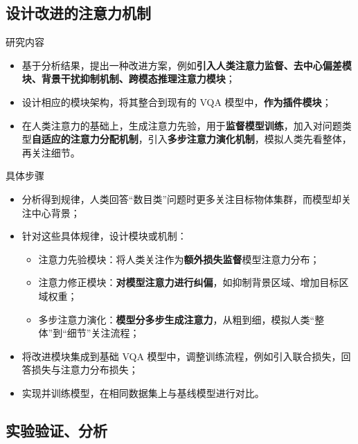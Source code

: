 \documentclass{beamer}
\begin{document}
\subsection{设计改进的注意力机制}

\begin{frame}{研究内容}
    \begin{itemize}
        \item 基于分析结果，提出一种改进方案，例如\textcolor{deepred}{\textbf{引入人类注意力监督、去中心偏差模块、背景干扰抑制机制、跨模态推理注意力模块}}；
        \item 设计相应的模块架构，将其整合到现有的 VQA 模型中，\textcolor{deepred}{\textbf{作为插件模块}}；
        \item 在人类注意力的基础上，生成注意力先验，用于\textcolor{deepred}{\textbf{监督模型训练}}，加入对问题类型\textcolor{deepred}{\textbf{自适应的注意力分配机制}}，引入\textcolor{deepred}{\textbf{多步注意力演化机制}}，模拟人类先看整体，再关注细节。
    \end{itemize}
\end{frame}


\begin{frame}{具体步骤}
    \begin{itemize}
        \item 分析得到规律，人类回答“数目类”问题时更多关注目标物体集群，而模型却关注中心背景；
        \item 针对这些具体规律，设计模块或机制：
        \begin{itemize}
            \item 注意力先验模块：将人类关注作为\textcolor{deepred}{\textbf{额外损失监督}}模型注意力分布；
            \item 注意力修正模块：\textcolor{deepred}{\textbf{对模型注意力进行纠偏}}，如抑制背景区域、增加目标区域权重；
            \item 多步注意力演化：\textcolor{deepred}{\textbf{模型分多步生成注意力}}，从粗到细，模拟人类“整体”到“细节”关注流程；
        \end{itemize}
        \item 将改进模块集成到基础 VQA 模型中，调整训练流程，例如引入联合损失，回答损失与注意力分布损失；
        \item 实现并训练模型，在相同数据集上与基线模型进行对比。
    \end{itemize}
\end{frame}



\subsection{实验验证、分析}
\end{document}
